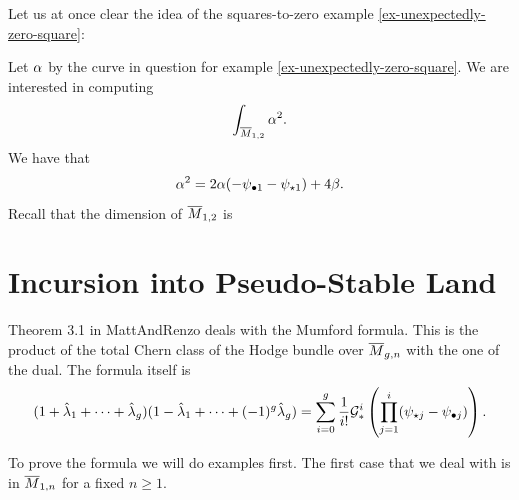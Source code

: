\documentclass[12pt]{memoir}
\begin{document}
Let us at once clear the idea of the squares-to-zero example \ref{ex-unexpectedly-zero-square}:

\begin{Ex}
    Let $\alpha$ by the curve in question for example \ref{ex-unexpectedly-zero-square}. We are interested in computing 
    $$\int_{\overline{M}_{1,2}}\alpha^2.$$
    We have that 
    $$\alpha^2=2\alpha(-\psi_{\bullet1}-\psi_{\star1})+4\beta.$$
    Recall that the dimension of $\overline{M}_{1,2}$ is 
\end{Ex}
\section{Incursion into Pseudo-Stable Land}

Theorem 3.1 in MattAndRenzo \cite{MattAndRenzo} deals with the Mumford formula. This is the product of the total Chern class of the Hodge bundle over $\overline{M}_{g,n}$ with the one of the dual. The formula itself is 
$$(1+\hat{\lambda}_1+\dots+\hat{\lambda}_g)(1-\hat{\lambda}_1+\dots+(-1)^g\hat{\lambda}_g)=\sum_{i=0}^g\frac{1}{i!}\mathcal{G}_\ast^i\left(\prod_{j=1}^i(\psi_{\star j}-\psi_{\bullet j})\right).$$

To prove the formula we will do examples first. The first case that we deal with is in $\overline M_{1,n}$ for a fixed $n\geq 1$.
\end{document}
